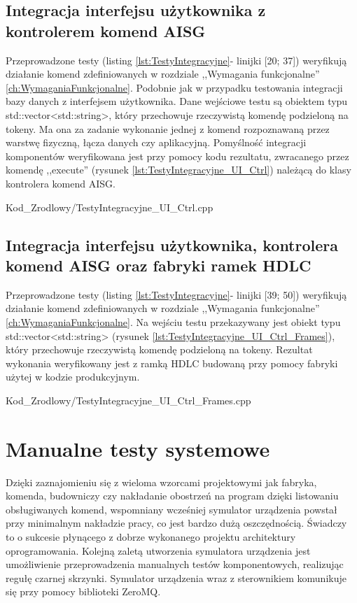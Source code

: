     \subsection{Integracja interfejsu użytkownika z kontrolerem komend AISG}
    Przeprowadzone testy (listing \ref{lst:TestyIntegracyjne}- linijki [20; 37]) weryfikują działanie komend zdefiniowanych w rozdziale ,,Wymagania funkcjonalne''
    \ref{ch:WymaganiaFunkcjonalne}.
    Podobnie jak w przypadku testowania integracji bazy danych z interfejsem użytkownika. Dane wejściowe testu są obiektem typu std::vector<std::string>, który przechowuje
    rzeczywistą komendę podzieloną na tokeny. Ma ona za zadanie wykonanie jednej z komend rozpoznawaną przez warstwę fizyczną, łącza danych czy aplikacyjną.
    Pomyślność integracji komponentów weryfikowana jest przy pomocy kodu rezultatu, zwracanego przez komendę ,,execute'' (rysunek \ref{lst:TestyIntegracyjne_UI_Ctrl})
    należącą do klasy kontrolera komend AISG.
    
        {Kod_Zrodlowy/TestyIntegracyjne_UI_Ctrl.cpp}
\newpage

    \subsection{Integracja interfejsu użytkownika, kontrolera komend AISG oraz fabryki ramek HDLC}
    Przeprowadzone testy (listing \ref{lst:TestyIntegracyjne}- linijki [39; 50]) weryfikują działanie komend zdefiniowanych w rozdziale ,,Wymagania funkcjonalne''
    \ref{ch:WymaganiaFunkcjonalne}.
    Na wejściu testu przekazywany jest obiekt typu std::vector<std::string> (rysunek \ref{lst:TestyIntegracyjne_UI_Ctrl_Frames}), który przechowuje rzeczywistą komendę podzieloną na tokeny. Rezultat wykonania
    weryfikowany jest z ramką HDLC budowaną przy pomocy fabryki użytej w kodzie produkcyjnym.
    
        {Kod_Zrodlowy/TestyIntegracyjne_UI_Ctrl_Frames.cpp}
\section{Manualne testy systemowe}
Dzięki zaznajomieniu się z wieloma wzorcami projektowymi jak fabryka, komenda, 
budowniczy czy nakładanie obostrzeń na program dzięki listowaniu obsługiwanych komend, wspomniany wcześniej symulator urządzenia powstał
przy minimalnym nakładzie pracy, co jest bardzo dużą oszczędnością. Świadczy to o sukcesie płynącego z 
dobrze wykonanego projektu architektury oprogramowania. Kolejną zaletą utworzenia symulatora urządzenia jest umożliwienie przeprowadzenia manualnych testów komponentowych, 
realizując regułę czarnej skrzynki. Symulator urządzenia wraz z sterownikiem komunikuje się przy pomocy biblioteki ZeroMQ.


